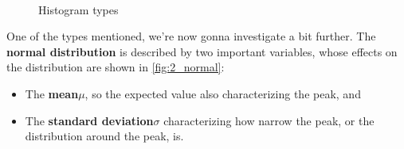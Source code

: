 \begin{figure}[H]
  \centering

  \hspace*{0.015\textwidth}
  \hspace*{0.015\textwidth}
  \\\vspace*{0.5cm}
  \hspace*{0.015\textwidth}
  \hspace*{0.015\textwidth}

  \caption{Histogram types}
  \label{fig:2_histogram_types}
\end{figure}

One of the types mentioned, we're now gonna investigate a bit further. The \textbf{normal distribution} is described by two important variables, whose effects on the distribution are shown in \ref{fig:2_normal}:
\begin{itemize}
  \item The \textbf{mean}$\mu$, so the expected value also characterizing the peak, and
  \item The \textbf{standard deviation}$\sigma$ characterizing how narrow the peak, or the distribution around the peak, is.
\end{itemize}

